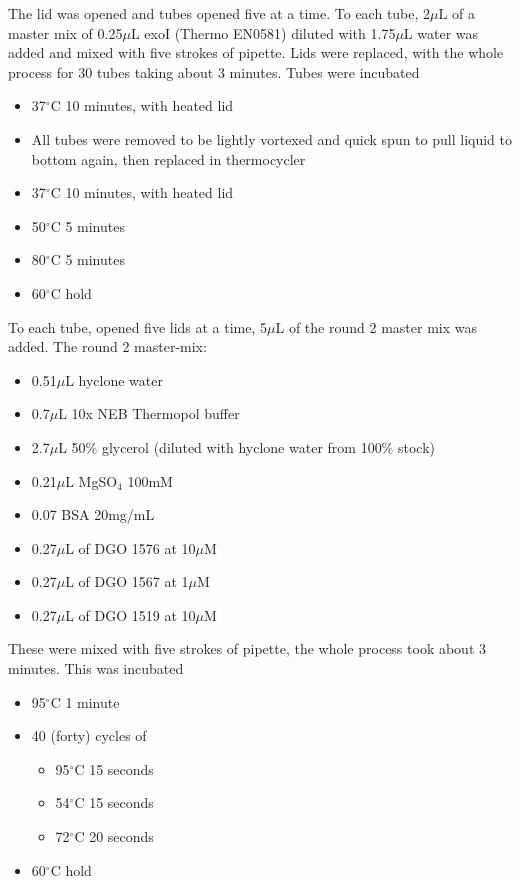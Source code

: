 {The lid was opened and tubes opened five at a time. To each tube,
2\(\mu\)L of a master mix of 0.25\(\mu\)L exoI (Thermo EN0581) diluted
with 1.75\(\mu\)L water was added and mixed with five strokes of
pipette. Lids were replaced, with the whole process for 30 tubes taking
about 3 minutes. Tubes were incubated

\begin{itemize}
\tightlist
\item
  37\(^{\circ}\)C 10 minutes, with heated lid
\item
  All tubes were removed to be lightly vortexed and quick spun to pull
  liquid to bottom again, then replaced in thermocycler
\item
  37\(^{\circ}\)C 10 minutes, with heated lid
\item
  50\(^{\circ}\)C 5 minutes
\item
  80\(^{\circ}\)C 5 minutes
\item
  60\(^{\circ}\)C hold
\end{itemize}

To each tube, opened five lids at a time, 5\(\mu\)L of the round 2
master mix was added. The round 2 master-mix:

\begin{itemize}
\tightlist
\item
  0.51\(\mu\)L hyclone water
\item
  0.7\(\mu\)L 10x NEB Thermopol buffer
\item
  2.7\(\mu\)L 50\% glycerol (diluted with hyclone water from 100\%
  stock)
\item
  0.21\(\mu\)L MgSO\(_4\) 100mM
\item
  0.07 BSA 20mg/mL
\item
  0.27\(\mu\)L of DGO 1576 at 10\(\mu\)M
\item
  0.27\(\mu\)L of DGO 1567 at 1\(\mu\)M
\item
  0.27\(\mu\)L of DGO 1519 at 10\(\mu\)M
\end{itemize}

These were mixed with five strokes of pipette, the whole process took
about 3 minutes. This was incubated

\begin{itemize}
\tightlist
\item
  95\(^{\circ}\)C 1 minute
\item
  40 (forty) cycles of

  \begin{itemize}
  \tightlist
  \item
    95\(^{\circ}\)C 15 seconds
  \item
    54\(^{\circ}\)C 15 seconds
  \item
    72\(^{\circ}\)C 20 seconds
  \end{itemize}
\item
  60\(^{\circ}\)C hold
\end{itemize}

}
